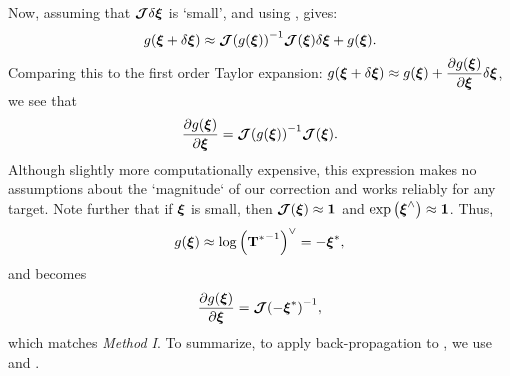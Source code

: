 \noindent Now, assuming that $\boldsymbol{\mathbf{\mathcal{J}}} \delta \boldsymbol{\mathbf{\xi}}$ is `small', and using ,  gives: 
\begin{equation}
	g({\boldsymbol{\mathbf{\xi}} + \delta \boldsymbol{\mathbf{\xi}}}) \approx {  \boldsymbol{\mathbf{\mathcal{J}}}  (g({  \boldsymbol{\mathbf{\xi}}  }))}^{-1} \boldsymbol{\mathbf{\mathcal{J}}}( \boldsymbol{\mathbf{\xi}}) \delta \boldsymbol{\mathbf{\xi}} + g({\boldsymbol{\mathbf{\xi}}}).
\end{equation}
Comparing this to the first order Taylor expansion: $g({\boldsymbol{\mathbf{\xi}} + \delta \boldsymbol{\mathbf{\xi}}}) \approx g({\boldsymbol{\mathbf{\xi}}}) +  \dfrac{\partial g({\boldsymbol{\mathbf{\xi}}})}{\partial \boldsymbol{\mathbf{\xi}}} \delta \boldsymbol{\mathbf{\xi}}$, we see that
\begin{equation}
	\label{eq:logjacob_method2}
	\dfrac{\partial g({\boldsymbol{\mathbf{\xi}}})}{\partial \boldsymbol{\mathbf{\xi}}} = {\boldsymbol{\mathbf{\mathcal{J}}}(g({\boldsymbol{\mathbf{\xi}}}))}^{-1} \boldsymbol{\mathbf{\mathcal{J}}}( \boldsymbol{\mathbf{\xi}}).
\end{equation}
Although slightly more computationally expensive, this expression makes no assumptions about the `magnitude` of our correction and works reliably for any target. Note further that if $\boldsymbol{\mathbf{\xi}}$ is small, then $\boldsymbol{\mathbf{\mathcal{J}}}( \boldsymbol{\mathbf{\xi}}) \approx \boldsymbol{\mathbf{1}}$ and $\mathrm{exp}\left({\boldsymbol{\mathbf{\xi}}}^{\wedge}\right) \approx \boldsymbol{\mathbf{1}}$. Thus,
\begin{equation}
	g({\boldsymbol{\mathbf{\xi}}}) \approx \mathrm{log}\left({{\boldsymbol{\mathbf{T}}^*}^{-1}}\right)^{\vee} = -\boldsymbol{\mathbf{\xi}}^*,
\end{equation}
and  becomes
\begin{equation}
	\dfrac{\partial g({\boldsymbol{\mathbf{\xi}}})}{\partial \boldsymbol{\mathbf{\xi}}} = {\boldsymbol{\mathbf{\mathcal{J}}}(-\boldsymbol{\mathbf{\xi}}^*)}^{-1}, 
\end{equation}
which matches \textit{Method I}. To summarize, to apply back-propagation to , we use  and .


